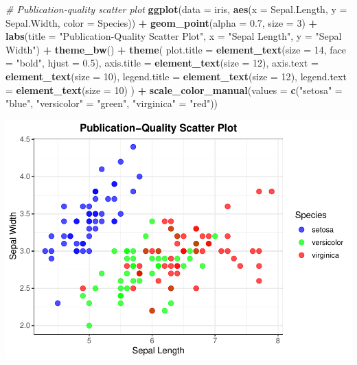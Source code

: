 \documentclass[
]{book}
\newenvironment{Shaded}{\begin{snugshade}}{\end{snugshade}}
\newcommand{\AttributeTok}[1]{\textcolor[rgb]{0.13,0.29,0.53}{#1}}
\newcommand{\CommentTok}[1]{\textcolor[rgb]{0.56,0.35,0.01}{\textit{#1}}}
\newcommand{\DecValTok}[1]{\textcolor[rgb]{0.00,0.00,0.81}{#1}}
\newcommand{\FloatTok}[1]{\textcolor[rgb]{0.00,0.00,0.81}{#1}}
\newcommand{\FunctionTok}[1]{\textcolor[rgb]{0.13,0.29,0.53}{\textbf{#1}}}
\newcommand{\NormalTok}[1]{#1}
\newcommand{\OtherTok}[1]{\textcolor[rgb]{0.56,0.35,0.01}{#1}}
\newcommand{\SpecialCharTok}[1]{\textcolor[rgb]{0.81,0.36,0.00}{\textbf{#1}}}
\newcommand{\StringTok}[1]{\textcolor[rgb]{0.31,0.60,0.02}{#1}}
\begin{document}
\begin{Shaded}
\begin{Highlighting}[]
\CommentTok{\# Publication{-}quality scatter plot}
\FunctionTok{ggplot}\NormalTok{(}\AttributeTok{data =}\NormalTok{ iris, }\FunctionTok{aes}\NormalTok{(}\AttributeTok{x =}\NormalTok{ Sepal.Length, }\AttributeTok{y =}\NormalTok{ Sepal.Width, }\AttributeTok{color =}\NormalTok{ Species)) }\SpecialCharTok{+} 
  \FunctionTok{geom\_point}\NormalTok{(}\AttributeTok{alpha =} \FloatTok{0.7}\NormalTok{, }\AttributeTok{size =} \DecValTok{3}\NormalTok{) }\SpecialCharTok{+}
  \FunctionTok{labs}\NormalTok{(}\AttributeTok{title =} \StringTok{"Publication{-}Quality Scatter Plot"}\NormalTok{,}
       \AttributeTok{x =} \StringTok{"Sepal Length"}\NormalTok{, }\AttributeTok{y =} \StringTok{"Sepal Width"}\NormalTok{) }\SpecialCharTok{+}
  \FunctionTok{theme\_bw}\NormalTok{() }\SpecialCharTok{+}
  \FunctionTok{theme}\NormalTok{(}
    \AttributeTok{plot.title =} \FunctionTok{element\_text}\NormalTok{(}\AttributeTok{size =} \DecValTok{14}\NormalTok{, }\AttributeTok{face =} \StringTok{"bold"}\NormalTok{, }\AttributeTok{hjust =} \FloatTok{0.5}\NormalTok{),}
    \AttributeTok{axis.title =} \FunctionTok{element\_text}\NormalTok{(}\AttributeTok{size =} \DecValTok{12}\NormalTok{),}
    \AttributeTok{axis.text =} \FunctionTok{element\_text}\NormalTok{(}\AttributeTok{size =} \DecValTok{10}\NormalTok{),}
    \AttributeTok{legend.title =} \FunctionTok{element\_text}\NormalTok{(}\AttributeTok{size =} \DecValTok{12}\NormalTok{),}
    \AttributeTok{legend.text =} \FunctionTok{element\_text}\NormalTok{(}\AttributeTok{size =} \DecValTok{10}\NormalTok{)}
\NormalTok{  ) }\SpecialCharTok{+}
  \FunctionTok{scale\_color\_manual}\NormalTok{(}\AttributeTok{values =} \FunctionTok{c}\NormalTok{(}\StringTok{"setosa"} \OtherTok{=} \StringTok{"blue"}\NormalTok{, }\StringTok{"versicolor"} \OtherTok{=} \StringTok{"green"}\NormalTok{, }\StringTok{"virginica"} \OtherTok{=} \StringTok{"red"}\NormalTok{))}
\end{Highlighting}
\end{Shaded}

\includegraphics{_main_files/figure-latex/unnamed-chunk-87-1.pdf}
\end{document}
